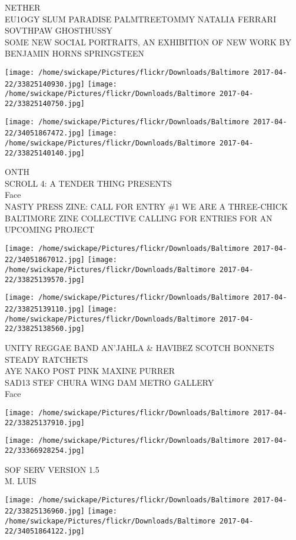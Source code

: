 \documentclass[10pt,letterpaper]{article}
\begin{document}
NETHER\\
EU1OGY SLUM PARADISE PALMTREETOMMY NATALIA FERRARI SOVTHPAW GHOSTHUSSY\\
SOME NEW SOCIAL PORTRAITS, AN EXHIBITION OF NEW WORK BY BENJAMIN HORNS SPRINGSTEEN
\pagebreak

\texttt{[image: /home/swickape/Pictures/flickr/Downloads/Baltimore 2017-04-22/33825140930.jpg]}
\texttt{[image: /home/swickape/Pictures/flickr/Downloads/Baltimore 2017-04-22/33825140750.jpg]}

\texttt{[image: /home/swickape/Pictures/flickr/Downloads/Baltimore 2017-04-22/34051867472.jpg]}
\texttt{[image: /home/swickape/Pictures/flickr/Downloads/Baltimore 2017-04-22/33825140140.jpg]}

ONTH\\
SCROLL 4: A TENDER THING PRESENTS\\
Face\\
NASTY PRESS ZINE: CALL FOR ENTRY \#1 WE ARE A THREE{-}CHICK BALTIMORE ZINE COLLECTIVE CALLING FOR ENTRIES FOR AN UPCOMING PROJECT
\pagebreak

\texttt{[image: /home/swickape/Pictures/flickr/Downloads/Baltimore 2017-04-22/34051867012.jpg]}
\texttt{[image: /home/swickape/Pictures/flickr/Downloads/Baltimore 2017-04-22/33825139570.jpg]}

\texttt{[image: /home/swickape/Pictures/flickr/Downloads/Baltimore 2017-04-22/33825139110.jpg]}
\texttt{[image: /home/swickape/Pictures/flickr/Downloads/Baltimore 2017-04-22/33825138560.jpg]}

UNITY REGGAE BAND AN'JAHLA \& HAVIBEZ SCOTCH BONNETS STEADY RATCHETS\\
AYE NAKO POST PINK MAXINE PURRER\\
SAD13 STEF CHURA WING DAM METRO GALLERY\\
Face
\pagebreak

\texttt{[image: /home/swickape/Pictures/flickr/Downloads/Baltimore 2017-04-22/33825137910.jpg]}

\vspace{0.25in}
\texttt{[image: /home/swickape/Pictures/flickr/Downloads/Baltimore 2017-04-22/33366928254.jpg]}

SOF SERV VERSION 1.5\\
M. LUIS
\pagebreak

\texttt{[image: /home/swickape/Pictures/flickr/Downloads/Baltimore 2017-04-22/33825136960.jpg]}
\texttt{[image: /home/swickape/Pictures/flickr/Downloads/Baltimore 2017-04-22/34051864122.jpg]}
\end{document}
